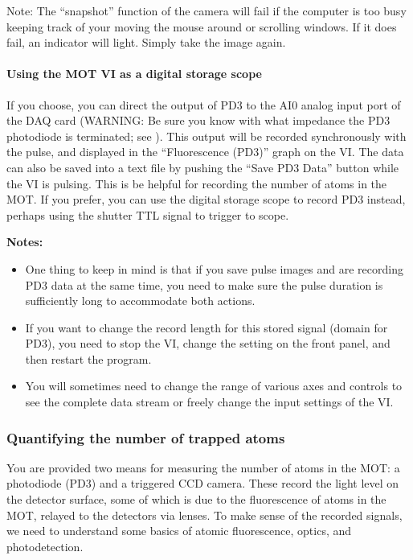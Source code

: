 \documentclass{../lab}
\begin{document}
Note: The ``snapshot'' function of the camera will fail if the computer is too busy keeping track of your moving the mouse around or scrolling windows. If it does fail, an indicator will light. Simply take the image again.

\paragraph{Using the MOT VI as a digital storage scope}

If you choose, you can direct the output of PD3 to the AI0 analog input port of the DAQ card (WARNING: Be sure you know with what impedance the PD3 photodiode is terminated; see ). This output will be recorded synchronously with the pulse, and displayed in the ``Fluorescence (PD3)'' graph on the VI. The data can also be saved into a text file by pushing the ``Save PD3 Data'' button while the VI is pulsing. This is be helpful for recording the number of atoms in the MOT. If you prefer, you can use the digital storage scope to record PD3 instead, perhaps using the shutter TTL signal to trigger to scope.

\textbf{Notes:}

\begin{itemize}
    \item One thing to keep in mind is that if you save pulse images and are recording PD3 data at the same time, you need to make sure the pulse duration is sufficiently long to accommodate both actions.

    \item If you want to change the record length for this stored signal (domain for PD3), you need to stop the VI, change the setting on the front panel, and then restart the program.

    \item You will sometimes need to change the range of various axes and controls to see the complete data stream or freely change the input settings of the VI.
\end{itemize}

\subsubsection{Quantifying the number of trapped atoms}

You are provided two means for measuring the number of atoms in the MOT: a photodiode (PD3) and a triggered CCD camera. These record the light level on the detector surface, some of which is due to the fluorescence of atoms in the MOT, relayed to the detectors via lenses. To make sense of the recorded signals, we need to understand some basics of atomic fluorescence, optics, and photodetection.
\end{document}
